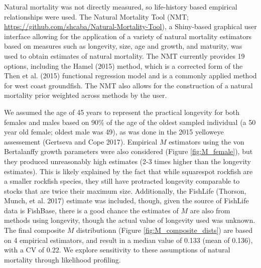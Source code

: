 \documentclass[11pt,
  english,
  a4paper,
]{article}
\begin{document}
\leavevmode\tagmcend\tagstructend


Natural mortality was not directly measured, so life-history based empirical relationships were used. The Natural Mortality Tool (NMT; {\url{https://github.com/shcaba/Natural-Mortality-Tool}\leavevmode\tagmcend\tagstructend}), a Shiny-based graphical user interface allowing for the application of a variety of natural mortality estimators based on measures such as longevity, size, age and growth, and maturity, was used to obtain estimates of natural mortality. The NMT currently provides 19 options, including the Hamel {(2015)\leavevmode\tagmcend\tagstructend} method, which is a corrected form of the Then et al. {(2015)\leavevmode\tagmcend\tagstructend} functional regression model and is a commonly applied method for west coast groundfish. The NMT also allows for the construction of a natural mortality prior weighted across methods by the user.

\leavevmode\tagmcend\tagstructend\par


We assumed the age of 45 years to represent the practical longevity for both females and males based on 90\% of the age of the oldest sampled individual (a 50 year old female; oldest male was 49), as was done in the 2015 yelloweye assessement {(Gertseva and Cope 2017)\leavevmode\tagmcend\tagstructend}. Empirical {\(M\)\leavevmode\tagmcend\tagstructend} estimators using the von Bertalanffy growth parameters were also considered (Figure \ref{fig:M_female}), but they produced unreasonably high estimates (2-3 times higher than the longevity estimates). This is likely explained by the fact that while squarespot rockfish are a smaller rockfish species, they still have protracted longevity comparable to stocks that are twice their maximum size. Additionally, the FishLife {(Thorson, Munch, et al. 2017)\leavevmode\tagmcend\tagstructend} estimate was included, though, given the source of FishLife data is FishBase, there is a good chance the estimates of {\(M\)\leavevmode\tagmcend\tagstructend} are also from methods using longevity, though the actual value of longevity used was unknown. The final composite {\(M\)\leavevmode\tagmcend\tagstructend} distributionn (Figure \ref{fig:M_composite_dists}) are based on 4 empirical estimators, and result in a median value of 0.133 (mean of 0.136), with a CV of 0.22. We explore sensitivity to these assumptions of natural mortality through likelihood profiling.
\end{document}
